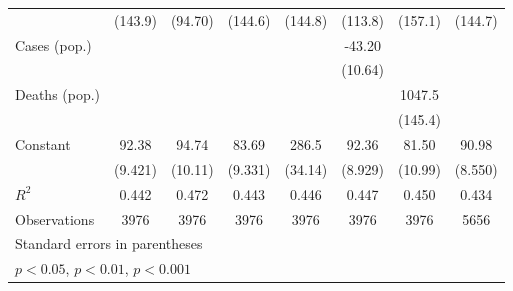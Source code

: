\documentclass{article}
\begin{document}
{\begin{longtable}{l*{7}{c}}
                &  (143.9)         &  (94.70)         &  (144.6)         &  (144.8)         &  (113.8)         &  (157.1)         &  (144.7)         \\
Cases (pop.)    &                  &                  &                  &                  &   -43.20\sym{***}&                  &                  \\
                &                  &                  &                  &                  &  (10.64)         &                  &                  \\
Deaths (pop.)   &                  &                  &                  &                  &                  &   1047.5\sym{***}&                  \\
                &                  &                  &                  &                  &                  &  (145.4)         &                  \\
Constant        &    92.38\sym{***}&    94.74\sym{***}&    83.69\sym{***}&    286.5\sym{***}&    92.36\sym{***}&    81.50\sym{***}&    90.98\sym{***}\\
                &  (9.421)         &  (10.11)         &  (9.331)         &  (34.14)         &  (8.929)         &  (10.99)         &  (8.550)         \\
\hline
\(R^{2}\)       &    0.442         &    0.472         &    0.443         &    0.446         &    0.447         &    0.450         &    0.434         \\
Observations    &     3976         &     3976         &     3976         &     3976         &     3976         &     3976         &     5656         \\
\hline\hline
\multicolumn{8}{l}{\footnotesize Standard errors in parentheses}\\
\multicolumn{8}{l}{\footnotesize \sym{*} \(p<0.05\), \sym{**} \(p<0.01\), \sym{***} \(p<0.001\)}\\
\end{longtable}
}
\end{document}
